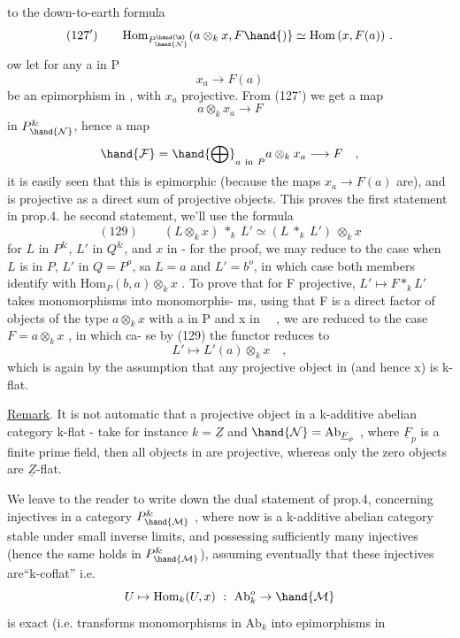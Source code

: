 
to the down-to-earth formula
\[ (127')\qquad \mathrm{Hom}_{P^{\hand{\&}}_{\hand{\mathcal{N}}}}(a\otimes_k x,F\hand{)}\simeq\mathrm{Hom}\,(x,F(a))\ . \]
ow let for any a in P
\[ x_a\to F(a) \]
be an epimorphism in , with $x_a$ projective. From (127') we get a map
\[ a\otimes_k x_a\to F \]
in $P^{\&}_{\hand{\mathcal{N}}}$, hence a map
\[ \hand{\mathcal{F}} = \hand{\bigoplus}_{a\ \mathrm{in}\ P} a\otimes_k x_a \longrightarrow F\quad , \]
it is easily seen that this is epimorphic (because the maps $x_a\to F(a)$
are), and  is projective as a direct sum of projective objects. This
proves the first statement in prop.4.  he second statement, we'll use
the formula
\[ (129)\qquad (L\otimes_k x)\ *_k\ L'\simeq(L\ *_k\ L')\ \otimes_k x \]
for $L$ in $P^{\&}$, $L'$ in $Q^{\&}$, and $x$ in  - for the proof, we may reduce
to the case when $L$ is in $P$, $L'$ in $Q=P^{o}$, sa $L=a$ and $L'=b^{o}$,
in which case both members identify with $\mathrm{Hom}_P(b,a)\otimes_k x$ . To prove that
for F projective, $L'\mapsto F *_k L'$ takes monomorphisms into monomorphis-%
ms, using that F is a direct factor of objects of the type $a\otimes_k x$ with
a in P and x in \ \ , we are reduced to the case $F = a\otimes_k x$ , in which ca-%
se by (129) the functor reduces to
\[ L'\mapsto L'(a)\otimes_k x\quad , \]
which is again  by the assumption that  any projective object in
(and hence x) is k-flat.

\uline{Remark}. It is not automatic that a projective object in a k-additive
abelian category  k-flat - take for instance $k=\underline{Z}$ and $\hand{\mathcal{N}}= \mathrm{Ab}_{\underline{F}_p}$ ,
where $\underline{F}_p$ is a finite prime field, then  all objects in
 are projective, whereas only the zero objects are $\underline{Z}$-flat.

We leave to the reader to write down the dual statement of prop.4,
concerning injectives in a category $P^{\&}_{\hand{\mathcal{M}}}$ , where now  is a k-additive
abelian category stable under small inverse limits, and possessing
sufficiently many injectives (hence the same holds in $P^{\&}_{\hand{\mathcal{M}}}$),  assuming
eventually that these injectives are``k-coflat'' i.e.
\[ U\mapsto\mathrm{Hom}_k(U,x)\ :\ \mathrm{Ab}_k^{o}\to\hand{\mathcal{M}} \]
is exact (i.e. transforms monomorphisms in $\mathrm{Ab}_k$ into epimorphisms in


